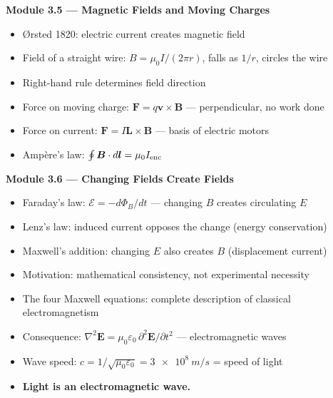 \documentclass[12pt, a4paper, twoside]{book}
\theoremstyle{disc}
\begin{document}
\begin{tcolorbox}[enhanced,colback=deep!4,colframe=deep,
  title={\bfseries\color{white} Key Ideas: Modules 3.5--3.6},
  attach boxed title to top left={yshift=-2mm,xshift=4mm},
  boxed title style={colback=deep}]

\textbf{Module 3.5 --- Magnetic Fields and Moving Charges}
\begin{itemize}[leftmargin=1.5em,itemsep=2pt]
  \item \O{}rsted 1820: electric current creates magnetic field
  \item Field of a straight wire: $B = \mu_0 I/(2\pi r)$, falls as $1/r$, circles the wire
  \item Right-hand rule determines field direction
  \item Force on moving charge: $\bm{F} = q\bm{v}\times\bm{B}$ --- perpendicular, no work done
  \item Force on current: $\bm{F} = I\bm{L}\times\bm{B}$ --- basis of electric motors
  \item Amp\`ere's law: $\oint\bm{B}\cdot d\bm{l} = \mu_0 I_{\rm enc}$
\end{itemize}

\vspace{6pt}
\textbf{Module 3.6 --- Changing Fields Create Fields}
\begin{itemize}[leftmargin=1.5em,itemsep=2pt]
  \item Faraday's law: $\mathcal{E} = -d\Phi_B/dt$ --- changing $B$ creates circulating $E$
  \item Lenz's law: induced current opposes the change (energy conservation)
  \item Maxwell's addition: changing $E$ also creates $B$ (displacement current)
  \item Motivation: mathematical consistency, not experimental necessity
  \item The four Maxwell equations: complete description of classical electromagnetism
  \item Consequence: $\nabla^2\bm{E} = \mu_0\varepsilon_0\,\partial^2\bm{E}/\partial t^2$ --- electromagnetic waves
  \item Wave speed: $c = 1/\sqrt{\mu_0\varepsilon_0} = \SI{3e8}{m/s}$ = speed of light
  \item \textbf{Light is an electromagnetic wave.}
\end{itemize}
\end{tcolorbox}

\vspace{0.6cm}
\begin{center}
\end{center}
\end{document}
